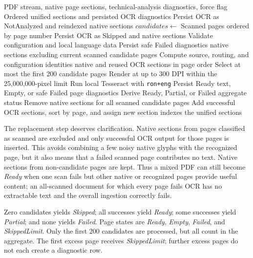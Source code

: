 \begin{algorithm}[!htbp]
	\caption{Selective local OCR routing and extraction}
	\label{alg:selective-ocr}
	\begin{algorithmic}[1]
		\Require PDF stream, native page sections, technical-analysis diagnostics, force flag
		\Ensure Ordered unified sections and persisted OCR diagnostics
			\State Persist OCR as NotAnalyzed and \Return reindexed native sections
		\EndIf
		\State $candidates \gets$ Scanned pages ordered by page number
			\State Persist OCR as Skipped and \Return native sections
		\EndIf
		\State Validate configuration and local language data
			\State Persist safe Failed diagnostics
			\State \Return native sections excluding current scanned candidate pages
		\EndIf
		\State Compute source, routing, and configuration identities
			\State \Return native and reused OCR sections in page order
		\EndIf
		\State Select at most the first 200 candidate pages
			\State Render at up to 300 DPI within the 25,000,000-pixel limit
			\State Run local Tesseract with \texttt{ron+eng}
			\State Persist Ready text, Empty, or safe Failed page diagnostics
		\EndFor
		\State Derive Ready, Partial, or Failed aggregate status
		\State Remove native sections for all scanned candidate pages
		\State Add successful OCR sections, sort by page, and assign new section indexes
		\State \Return the unified sections
	\end{algorithmic}
\end{algorithm}

The replacement step deserves clarification. Native sections from pages
classified as scanned are excluded and only successful OCR output for those
pages is inserted. This avoids combining a few noisy native glyphs with the
recognized page, but it also means that a failed scanned page contributes no
text. Native sections from non-candidate pages are kept. Thus a mixed PDF can
still become \emph{Ready} when one scan fails but other native or recognized
pages provide useful content; an all-scanned document for which every page
fails OCR has no extractable text and the overall ingestion correctly fails.

Zero candidates yields \emph{Skipped}; all successes yield \emph{Ready}; some
successes yield \emph{Partial}; and none yields \emph{Failed}. Page states are
\emph{Ready}, \emph{Empty}, \emph{Failed}, and \emph{SkippedLimit}. Only the
first 200 candidates are processed, but all count in the aggregate. The first
excess page receives \emph{SkippedLimit}; further excess pages do not each
create a diagnostic row.

